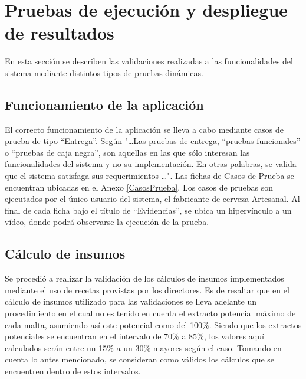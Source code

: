 \section{Pruebas de ejecución y despliegue de resultados}

\par En esta sección se describen las validaciones realizadas a las funcionalidades del sistema mediante distintos tipos de pruebas dinámicas.

\subsection{Funcionamiento de la aplicación}
El correcto funcionamiento de la aplicación se lleva a cabo mediante casos de prueba de tipo ``Entrega''. Según \cite{Som05} "\ldots Las pruebas de entrega, “pruebas funcionales” o “pruebas de caja negra”, son aquellas en las que sólo interesan las funcionalidades del sistema y no su implementación. En otras palabras, se valida que el sistema satisfaga sus requerimientos \ldots".
Las fichas de Casos de Prueba se encuentran ubicadas en el Anexo \ref{CasosPrueba}. Los casos de pruebas son ejecutados por el único usuario del sistema, el fabricante de cerveza Artesanal. Al final de cada ficha bajo el título de ``Evidencias'', se ubica un hipervínculo a un vídeo, donde podrá observarse la ejecución de la prueba.

\subsection{Cálculo de insumos}
\par Se procedió a realizar la validación de los cálculos de insumos implementados mediante el uso de recetas provistas por los directores. Es de resaltar que en el cálculo de insumos utilizado para las validaciones se lleva adelante un procedimiento en el cual no es tenido en cuenta el extracto potencial máximo de cada malta, asumiendo así este potencial como del 100\%. Siendo que los extractos potenciales se encuentran en el intervalo de 70\% a 85\%, los valores aquí calculados serán entre un 15\% a un 30\% mayores según el caso. Tomando en cuenta lo antes mencionado, se consideran como válidos los cálculos que se encuentren dentro de estos intervalos.


